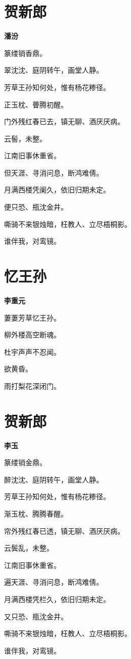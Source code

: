 \documentclass[12pt,a4paper]{ctexbook}
\begin{document}
\section{贺新郎}
\textbf{潘汾}\par\vspace{0.5em}
篆缕销香鼎。\par
翠沈沈、庭阴转午，画堂人静。\par
芳草王孙知何处，惟有杨花糁径。\par
正玉枕、瞢腾初醒。\par
门外残红春已去，镇无聊、酒厌厌病。\par
云髻，未整。\par
江南旧事休重省。\par
但天涯、寻消问息，断鸿难倩。\par
月满西楼凭阑久，依旧归期未定。\par
便只恐、瓶沈金井。\par
嘶骑不来银烛暗，枉教人、立尽梧桐影。\par
谁伴我，对鸾镜。\par

\section{忆王孙}
\textbf{李重元}\par\vspace{0.5em}
萋萋芳草忆王孙。\par
柳外楼高空断魂。\par
杜宇声声不忍闻。\par
欲黄昏。\par
雨打梨花深闭门。\par

\section{贺新郎}
\textbf{李玉}\par\vspace{0.5em}
篆缕销金鼎。\par
醉沈沈、庭阴转午，画堂人静。\par
芳草王孙知何处，惟有杨花糁径。\par
渐玉枕、腾腾春醒。\par
帘外残红春已透，镇无聊、酒厌厌病。\par
云鬓乱，未整。\par
江南旧事休重省。\par
遍天涯、寻消问息，断鸿难倩。\par
月满西楼凭栏久，依旧归期未定。\par
又只恐、瓶沈金井。\par
嘶骑不来银烛暗，枉教人、立尽梧桐影。\par
谁伴我，对鸾镜。\par
\end{document}

